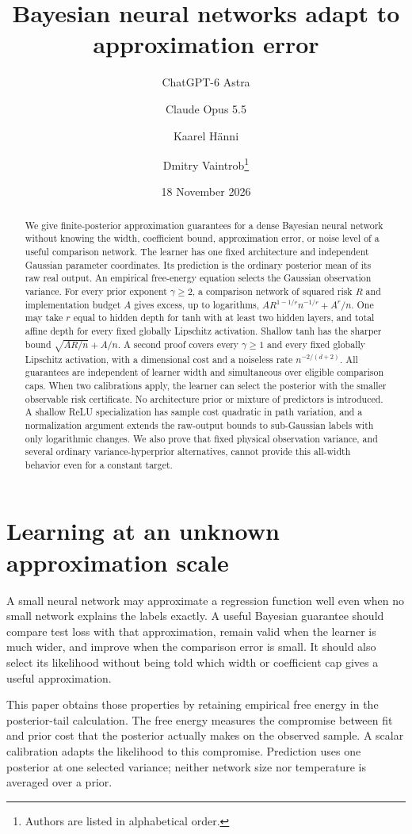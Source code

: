 \documentclass[11pt]{article}
\title{Bayesian neural networks adapt to approximation error}
\author{ChatGPT-6 Astra \and Claude Opus 5.5 \and Kaarel H\"anni \and Dmitry Vaintrob\thanks{Authors are listed in alphabetical order.}}
\date{18 November 2026}
\theoremstyle{definition}\newtheorem{definition}[theorem]{Definition}
\theoremstyle{remark}\newtheorem{remark}[theorem]{Remark}
\begin{document}
\maketitle
\begin{abstract}
We give finite-posterior approximation guarantees for a dense Bayesian neural network without knowing the width, coefficient bound, approximation error, or noise level of a useful comparison network. The learner has one fixed architecture and independent Gaussian parameter coordinates. Its prediction is the ordinary posterior mean of its raw real output. An empirical free-energy equation selects the Gaussian observation variance. For every prior exponent $\gamma\ge2$, a comparison network of squared risk $R$ and implementation budget $A$ gives excess, up to logarithms, $A R^{1-1/r}n^{-1/r}+A^r/n$. One may take $r$ equal to hidden depth for tanh with at least two hidden layers, and total affine depth for every fixed globally Lipschitz activation. Shallow tanh has the sharper bound $\sqrt{AR/n}+A/n$. A second proof covers every $\gamma\ge1$ and every fixed globally Lipschitz activation, with a dimensional cost and a noiseless rate $n^{-2/(d+2)}$. All guarantees are independent of learner width and simultaneous over eligible comparison caps. When two calibrations apply, the learner can select the posterior with the smaller observable risk certificate. No architecture prior or mixture of predictors is introduced. A shallow ReLU specialization has sample cost quadratic in path variation, and a normalization argument extends the raw-output bounds to sub-Gaussian labels with only logarithmic changes. We also prove that fixed physical observation variance, and several ordinary variance-hyperprior alternatives, cannot provide this all-width behavior even for a constant target.
\end{abstract}

\section{Learning at an unknown approximation scale}
A small neural network may approximate a regression function well even when no small network explains the labels exactly. A useful Bayesian guarantee should compare test loss with that approximation, remain valid when the learner is much wider, and improve when the comparison error is small. It should also select its likelihood without being told which width or coefficient cap gives a useful approximation.

This paper obtains those properties by retaining empirical free energy in the posterior-tail calculation. The free energy measures the compromise between fit and prior cost that the posterior actually makes on the observed sample. A scalar calibration adapts the likelihood to this compromise. Prediction uses one posterior at one selected variance; neither network size nor temperature is averaged over a prior.
\end{document}
